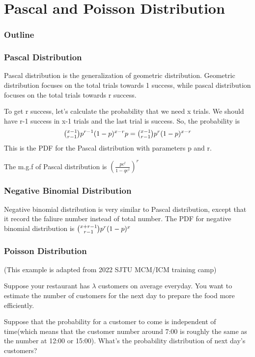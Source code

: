 \documentclass{beamer}
\begin{document}
\section{Pascal and Poisson Distribution}
\begin{frame}
    \frametitle{Outline}
    \tableofcontents[currentsection]
\end{frame}
\begin{frame}
    \frametitle{Pascal Distribution}
    Pascal distribution is the generalization of geometric distribution. Geometric distribution focuses on the total trials towards 1 success, while pascal distribution focuses on the total trials towards r success.\par
    To get r success, let's calculate the probability that we need x trials. We should have r-1 success in x-1 trials and the last trial is success. So, the probability is
    \[\tbinom{x-1}{r-1}p^{r-1}(1-p)^{x-r}p=\tbinom{x-1}{r-1}p^{r}(1-p)^{x-r}\]
    This is the PDF for the Pascal distribution with parameters p and r.\par
    The m.g.f of Pascal distribution is $(\frac{pe^t}{1-qe^t})^r$

\end{frame}

\begin{frame}
    \frametitle{Negative Binomial Distribution}
    Negative binomial distribution is very similar to Pascal distribution, except that it record the faliure number instead of total number. The PDF for negative binomial distribution is $\tbinom{x+r-1}{r-1}p^{r}(1-p)^{x}$
\end{frame}

\begin{frame}
    \frametitle{Poisson Distribution}
    (This example is adapted from 2022 SJTU MCM/ICM training camp)\par
    \vspace{0.3cm}
    Suppose your restaurant has $\lambda$ customers on average everyday. You want to estimate the number of customers for the next day to prepare the food more efficiently.\par
    Suppose that the probability for a customer to come is independent of time(which means that the customer number around 7:00 is roughly the same as the number at 12:00 or 15:00). What's the probability distribution of next day's customers?
\end{frame}
\end{document}
